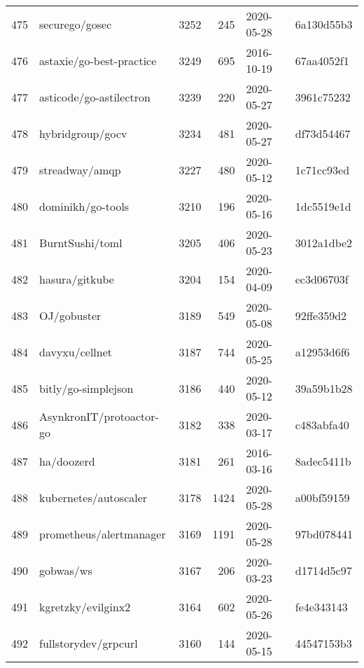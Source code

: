 \begin{longtable}{llrrll}
    475 &                                     securego/gosec &   3252 &    245 & 2020-05-28 &  6a130d55b3 \\
    476 &                           astaxie/go-best-practice &   3249 &    695 & 2016-10-19 &  67aa4052f1 \\
    477 &                            asticode/go-astilectron &   3239 &    220 & 2020-05-27 &  3961c75232 \\
    478 &                                   hybridgroup/gocv &   3234 &    481 & 2020-05-27 &  df73d54467 \\
    479 &                                     streadway/amqp &   3227 &    480 & 2020-05-12 &  1c71cc93ed \\
    480 &                                  dominikh/go-tools &   3210 &    196 & 2020-05-16 &  1dc5519e1d \\
    481 &                                    BurntSushi/toml &   3205 &    406 & 2020-05-23 &  3012a1dbe2 \\
    482 &                                     hasura/gitkube &   3204 &    154 & 2020-04-09 &  ec3d06703f \\
    483 &                                        OJ/gobuster &   3189 &    549 & 2020-05-08 &  92ffe359d2 \\
    484 &                                     davyxu/cellnet &   3187 &    744 & 2020-05-25 &  a12953d6f6 \\
    485 &                                bitly/go-simplejson &   3186 &    440 & 2020-05-12 &  39a59b1b28 \\
    486 &                           AsynkronIT/protoactor-go &   3182 &    338 & 2020-03-17 &  c483abfa40 \\
    487 &                                         ha/doozerd &   3181 &    261 & 2016-03-16 &  8adec5411b \\
    488 &                              kubernetes/autoscaler &   3178 &   1424 & 2020-05-28 &  a00bf59159 \\
    489 &                            prometheus/alertmanager &   3169 &   1191 & 2020-05-28 &  97bd078441 \\
    490 &                                          gobwas/ws &   3167 &    206 & 2020-03-23 &  d1714d5c97 \\
    491 &                                 kgretzky/evilginx2 &   3164 &    602 & 2020-05-26 &  fe4e343143 \\
    492 &                               fullstorydev/grpcurl &   3160 &    144 & 2020-05-15 &  44547153b3 \\

\end{longtable}
